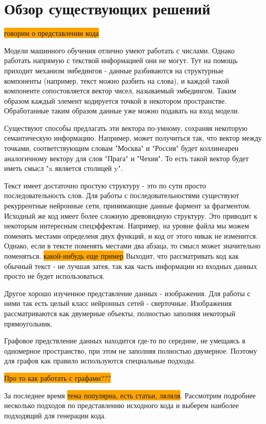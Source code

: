 \documentclass[times,specification,annotation]{itmo-student-thesis}
\begin{document}
\chapter{Обзор существующих решений}

\colorbox{orange}{говорим о представлении кода}

Модели машинного обучения отлично умеют работать с числами. Однако работать напрямую с текствой информацией они не могут. Тут на помощь приходит механизм эмбедингов - данные разбиваются на структурные компоненты (например, текст можно разбить на слова), и каждой такой компоненте сопостовляется вектор чисел, называемый эмбедингом. Таким образом каждый элемент кодируется точкой в некотором пространстве. Обработанные таким образом данные уже можно подавать на вход модели.

Существуют способы предлагать эти вектора по-умному, сохраняя некоторую семантическую информацию. Например, может получиться так, что вектор между точками, соответствующим словам "Москва" и "Россия" будет коллинеарен аналогичному вектору для слов "Прага" и "Чехия". То есть такой вектор будет иметь смысл "x является столицей y".

Текст имеет достаточно простую структуру - это по сути просто последовательность слов. Для работы с последовательностями существуют рекуррентные нейронные сети, принимающие данные фармент за фрагментом. Исходный же код имеет более сложную древовидную структуру. Это приводит к некоторым интересным спецэффектам. Например, на уровне файла мы можем поменять местами определеня двух функций, и код от этого никак не изменится. Однако, если в тексте поменять местами два абзаца, то смысл может значительно поменяться. \colorbox{orange}{какой-нибудь еще пример} Выходит, что рассматривать код как обычный текст - не лучшая затея, так как часть информации из входных данных просто не будет использоваться.

Другое хорошо изученное представление данных - изображения. Для работы с ними так есть целый класс нейронных сетей - сверточные. Изображения рассматриваются как двумерные объекты, полностью заполняя некоторый прямоугольник.

Графовое предствление данных находится где-то по середине, не умещаясь в одномерное пространство, при этом не заполняя полностью двумерное. Поэтому для графов как правило используются специальные подходы.

\colorbox{orange}{Про то как работать с графами???}

За последнее время \colorbox{orange}{тема популярна, есть статьи, ляляля}. Рассмотрим подробнее несколько подходов по представлению исходного кода и выберем наиболее подходящий для генерации кода.
\end{document}
